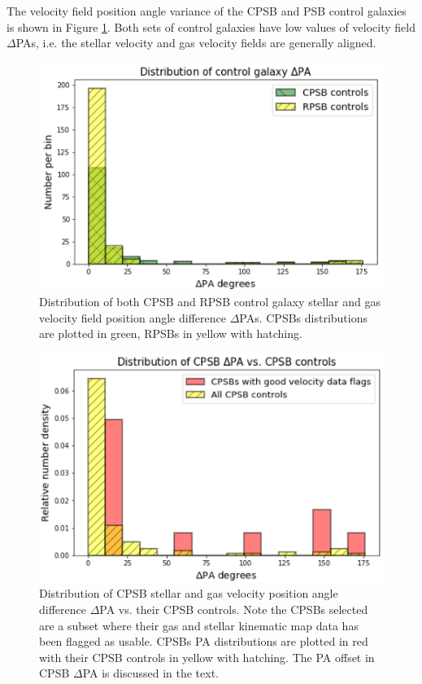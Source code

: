 The velocity field position angle variance of the CPSB and PSB control galaxies is shown in Figure \ref{fig:controlDeltaPAs}. Both sets of control galaxies have low values of velocity field $\Delta$PAs, i.e. the stellar velocity and gas velocity fields are generally aligned.

\begin{figure}
    \centering
    \includegraphics[width=\columnwidth]{images/JupyterPlots/DIST-Control-DPA-both.png}
    \caption[Distribution of control galaxy $\Delta$PAs]{Distribution of both CPSB and RPSB control galaxy stellar and gas velocity field position angle difference  $\Delta$PAs. CPSBs distributions are plotted in green, RPSBs in yellow with hatching.}
    \label{fig:controlDeltaPAs}
\end{figure}

\begin{figure}
    \centering
    \includegraphics[width=\columnwidth]{images/JupyterPlots/DIST-DPA-CPSB+FLAGS+controls.png}
    \caption[Distribution of CPSB $\Delta$PA vs. their CPSB controls]{Distribution of CPSB stellar and gas velocity position angle difference $\Delta$PA vs. their CPSB controls. Note the CPSBs selected are a subset where their gas and stellar kinematic map data has been flagged as usable. CPSBs PA distributions are plotted in red with their CPSB controls in yellow with hatching. The PA offset in CPSB $\Delta$PA is discussed in the text.}
    \label{fig:CPSBvsControlDeltaPAs}
\end{figure}

